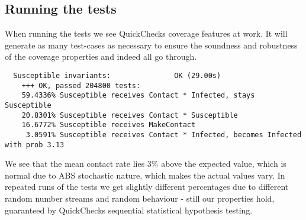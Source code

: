 %
%  
%
%
%

\subsection{Running the tests}
When running the tests we see QuickChecks coverage features at work. It will generate as many test-cases as necessary to ensure the soundness and robustness of the coverage properties and indeed all go through.

\begin{verbatim}
  Susceptible invariants:               OK (29.00s)
    +++ OK, passed 204800 tests:
    59.4336% Susceptible receives Contact * Infected, stays Susceptible
    20.8301% Susceptible receives Contact * Susceptible
    16.6772% Susceptible receives MakeContact
     3.0591% Susceptible receives Contact * Infected, becomes Infected with prob 3.13
\end{verbatim}

We see that the mean contact rate lies 3\% above the expected value, which is normal due to ABS stochastic nature, which makes the actual values vary. In repeated runs of the tests we get slightly different percentages due to different random number streams and random behaviour - still our properties hold, guaranteed by QuickChecks sequential statistical hypothesis testing.